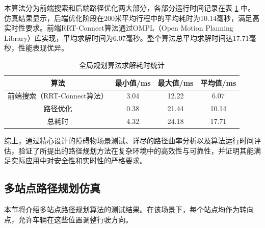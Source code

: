 \documentclass[master,academic]{ysuthesis} %
\begin{document}
		本算法分为前端搜索和后端路径优化两大部分，各部分运行时间记录在表 \ref{tab:global_planning_time} 中。仿真结果显示，后端优化阶段在200米平均行程中的平均耗时为10.14毫秒，满足高实时性要求。前端RRT-Connect算法通过OMPL（Open Motion Planning Library）库实现，平均求解时间为6.07毫秒。整个算法总平均求解时间达17.71毫秒，性能表现优异。
		\begin{table}[!ht]
			\caption{全局规划算法求解耗时统计}
			\label{tab:global_planning_time}
			\centering
			\begin{tabular}{cccc}
				\toprule
				算法   & 最小值/ms & 最大值/ms & 平均值/ms \\
				\midrule
				前端搜索（RRT-Connect算法） & 3.04    & 12.22   & 6.07       \\
				路径优化       & 0.38    & 21.44    & 10.14      \\
				总耗时         & 4.32    & 24.18    & 17.71      \\
				\bottomrule
			\end{tabular}
		\end{table}

		综上，通过精心设计的障碍物场景测试、详尽的路径曲率分析以及算法运行时间评估，验证了所提出的路径规划方法在复杂环境中的高效性与可靠性，并证明其能满足实际应用中对安全性和实时性的严格要求。

		\subsection{多站点路径规划仿真}
		本节将介绍多站点路径规划算法的测试结果。在该场景下，每个站点均作为转向点，允许车辆在这些位置调整行驶方向。
\end{document}
